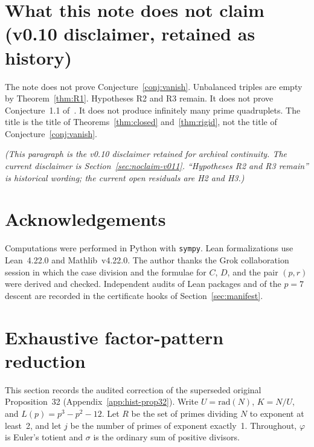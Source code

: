 \documentclass[11pt,reqno]{amsart}
\newcommand{\ph}{\varphi}
\newcommand{\sig}{\sigma}
\theoremstyle{definition}
\begin{document}
\section*{What this note does not claim (v0.10 disclaimer, retained as history)}

The note does not prove Conjecture~\ref{conj:vanish}. Unbalanced triples are empty by Theorem~\ref{thm:R1}. Hypotheses R2 and R3 remain. It does not prove Conjecture~1.1 of~\cite{RCW2026}. It does not produce infinitely many prime quadruplets. The title is the title of Theorems~\ref{thm:closed} and~\ref{thm:rigid}, not the title of Conjecture~\ref{conj:vanish}.

\noindent\textit{(This paragraph is the v0.10 disclaimer retained for archival continuity. The current disclaimer is Section~\ref{sec:noclaim-v011}. ``Hypotheses R2 and R3 remain'' is historical wording; the current open residuals are H2 and H3.)}

\section*{Acknowledgements}

Computations were performed in Python with \texttt{sympy}. Lean formalizations use Lean~4.22.0 and Mathlib~v4.22.0. The author thanks the Grok collaboration session in which the case division and the formulae for \(C\), \(D\), and the pair \((p,r)\) were derived and checked. Independent audits of Lean packages and of the \(p=7\) descent are recorded in the certificate hooks of Section~\ref{sec:manifest}.



\section{Exhaustive factor-pattern reduction}
\label{sec:exhaustive}

This section records the audited correction of the superseded original Proposition~32 (Appendix~\ref{app:hist-prop32}). Write \(U=\mathrm{rad}(N)\), \(K=N/U\), and \(L(p)=p^3-p^2-12\). Let \(R\) be the set of primes dividing \(N\) to exponent at least~2, and let \(j\) be the number of primes of exponent exactly~1. Throughout, \(\ph\) is Euler's totient and \(\sig\) is the ordinary sum of positive divisors.
\end{document}
